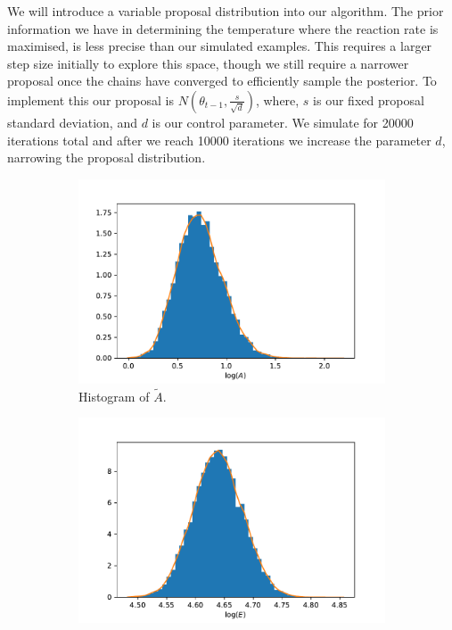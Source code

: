 We will introduce a variable proposal distribution into our algorithm. The prior information we have in determining the temperature where the reaction rate is maximised, is less precise than our simulated examples. This requires a larger step size initially to explore this space, though we still require a narrower proposal once the chains have converged to efficiently sample the posterior. To implement this our proposal is $N\left(\theta_{t-1},\frac{s}{\sqrt{d}}\right)$, where, $s$ is our fixed proposal standard deviation, and $d$ is our control parameter. We simulate for 20000 iterations total and after we reach 10000 iterations we increase the parameter $d$, narrowing the proposal distribution.\\ 
\begin{figure}[h!]
\centering
\begin{subfigure}{.5\textwidth}
  \centering
  \includegraphics[width=\linewidth]{figures/bayesian/1_reaction/EXP/hist_A.pdf}
  \caption{Histogram of $\tilde{A}$.}
  \label{fig:1EXPA}
\end{subfigure}%
\begin{subfigure}{.5\textwidth}
  \centering
  \includegraphics[width=\linewidth]{figures/bayesian/1_reaction/EXP/hist_E.pdf}

\end{subfigure}
\end{figure}
